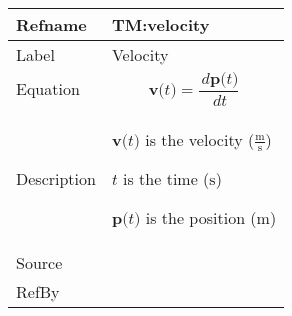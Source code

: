 \documentclass[12pt]{article}
\begin{document}
\begin{minipage}{\textwidth}
\begin{tabular}{>{\raggedright}p{}>{\raggedright\arraybackslash}p{}}
\toprule \textbf{Refname} & \textbf{TM:velocity}
\label{TM:velocity}
\\ \midrule
Label & Velocity
        
\\ \midrule
Equation & \begin{displaymath}
           \symbf{v}\text{(}t\text{)}=\frac{\,d\symbf{p}\text{(}t\text{)}}{\,dt}
           \end{displaymath}
\\ \midrule
Description & \begin{symbDescription}
              \item{$\symbf{v}\text{(}t\text{)}$ is the velocity ($\frac{\text{m}}{\text{s}}$)}
              \item{$t$ is the time (${\text{s}}$)}
              \item{$\symbf{p}\text{(}t\text{)}$ is the position (${\text{m}}$)}
              \end{symbDescription}
\\ \midrule
Source & \cite{velocityWiki}
         
\\ \midrule
RefBy & 
\\ \bottomrule
\end{tabular}
\end{minipage}
\vspace{\baselineskip}
\noindent
\end{document}
